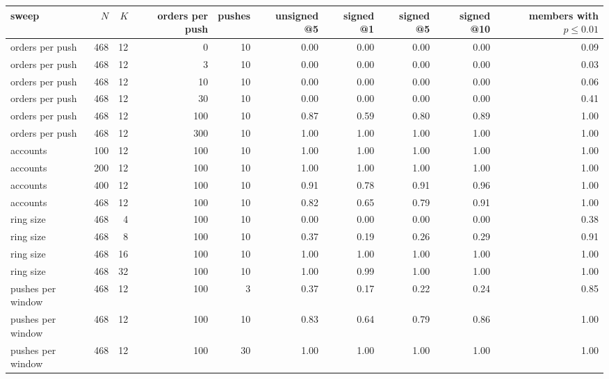 \begin{tabular}{lrrrrrrrrr}
\toprule
sweep & $N$ & $K$ & orders per push & pushes & unsigned @5 & signed @1 & signed @5 & signed @10 & members with $p\le0.01$ \\
\midrule
orders per push & 468 & 12 & 0 & 10 & 0.00 & 0.00 & 0.00 & 0.00 & 0.09 \\
orders per push & 468 & 12 & 3 & 10 & 0.00 & 0.00 & 0.00 & 0.00 & 0.03 \\
orders per push & 468 & 12 & 10 & 10 & 0.00 & 0.00 & 0.00 & 0.00 & 0.06 \\
orders per push & 468 & 12 & 30 & 10 & 0.00 & 0.00 & 0.00 & 0.00 & 0.41 \\
orders per push & 468 & 12 & 100 & 10 & 0.87 & 0.59 & 0.80 & 0.89 & 1.00 \\
orders per push & 468 & 12 & 300 & 10 & 1.00 & 1.00 & 1.00 & 1.00 & 1.00 \\
accounts & 100 & 12 & 100 & 10 & 1.00 & 1.00 & 1.00 & 1.00 & 1.00 \\
accounts & 200 & 12 & 100 & 10 & 1.00 & 1.00 & 1.00 & 1.00 & 1.00 \\
accounts & 400 & 12 & 100 & 10 & 0.91 & 0.78 & 0.91 & 0.96 & 1.00 \\
accounts & 468 & 12 & 100 & 10 & 0.82 & 0.65 & 0.79 & 0.91 & 1.00 \\
ring size & 468 & 4 & 100 & 10 & 0.00 & 0.00 & 0.00 & 0.00 & 0.38 \\
ring size & 468 & 8 & 100 & 10 & 0.37 & 0.19 & 0.26 & 0.29 & 0.91 \\
ring size & 468 & 16 & 100 & 10 & 1.00 & 1.00 & 1.00 & 1.00 & 1.00 \\
ring size & 468 & 32 & 100 & 10 & 1.00 & 0.99 & 1.00 & 1.00 & 1.00 \\
pushes per window & 468 & 12 & 100 & 3 & 0.37 & 0.17 & 0.22 & 0.24 & 0.85 \\
pushes per window & 468 & 12 & 100 & 10 & 0.83 & 0.64 & 0.79 & 0.86 & 1.00 \\
pushes per window & 468 & 12 & 100 & 30 & 1.00 & 1.00 & 1.00 & 1.00 & 1.00 \\
\bottomrule
\end{tabular}
